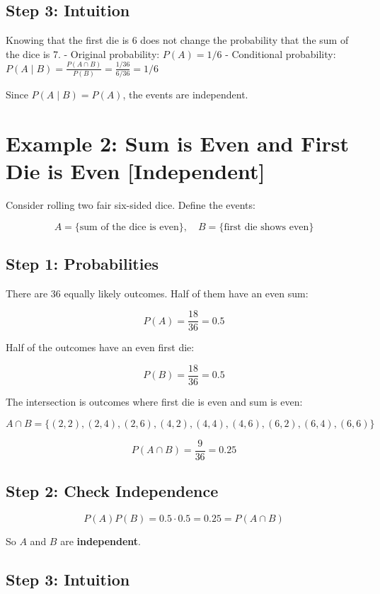 \documentclass[12pt]{article}
\begin{document}
\subsection*{Step 3: Intuition}

Knowing that the first die is 6 does not change the probability that the sum of the dice is 7.  
- Original probability: \(P(A) = 1/6\)  
- Conditional probability: \(P(A \mid B) = \frac{P(A \cap B)}{P(B)} = \frac{1/36}{6/36} = 1/6\)  

Since \(P(A \mid B) = P(A)\), the events are independent.

\bigskip

\section*{Example 2: Sum is Even and First Die is Even [Independent]}

Consider rolling two fair six-sided dice. Define the events:

\[
A = \{\text{sum of the dice is even}\}, \quad
B = \{\text{first die shows even}\}
\]

\subsection*{Step 1: Probabilities}

There are 36 equally likely outcomes. Half of them have an even sum:

\[
P(A) = \frac{18}{36} = 0.5
\]

Half of the outcomes have an even first die:

\[
P(B) = \frac{18}{36} = 0.5
\]

The intersection is outcomes where first die is even and sum is even:

\[
A \cap B = \{(2,2),(2,4),(2,6),(4,2),(4,4),(4,6),(6,2),(6,4),(6,6)\}
\]

\[
P(A \cap B) = \frac{9}{36} = 0.25
\]

\subsection*{Step 2: Check Independence}

\[
P(A)P(B) = 0.5 \cdot 0.5 = 0.25 = P(A \cap B)
\]

So \(A\) and \(B\) are \textbf{independent}.

\subsection*{Step 3: Intuition}
\end{document}
